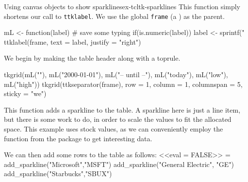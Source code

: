 \begin{example}{Using canvas objects to show sparklines}{ex-tcltk-sparklines}
This function simply shortens our call to \texttt{ttklabel}. We use
the global \texttt{frame} (a ) as the parent.
\begin{Schunk}
\begin{Sinput}
 mL <- function(label) { # save some typing
   if(is.numeric(label))
     label <- sprintf("%
   ttklabel(frame, text = label, justify = "right") 
 }
\end{Sinput}
\end{Schunk}
%
We begin by making the table header along with a toprule.
\begin{Schunk}
\begin{Sinput}
 tkgrid(mL(""), mL("2000-01-01"), mL("-- until --"), 
        mL("today"), mL("low"), mL("high"))
 tkgrid(ttkseparator(frame), row = 1, column = 1, columnspan = 5, 
        sticky = "we")
\end{Sinput}
\end{Schunk}
%
This function adds a sparkline to the table. A sparkline here is just
a line item, but there is some work to do, in order to scale the
values to fit the allocated space. This example uses stock values, as
we can conveniently employ the  function from
the  package to get interesting data.
\begin{Schunk}
\end{Schunk}

We can then add some rows to the table as follows:
<<eval = FALSE>> = 
add_sparkline("Microsoft","MSFT")
add_sparkline("General Electric", "GE")
add_sparkline("Starbucks","SBUX")
\end{example}

